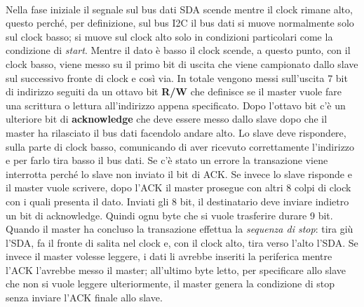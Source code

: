 \documentclass[12pt, a4paper]{report}
\begin{document}
\\Nella fase iniziale il segnale sul bus dati SDA scende mentre il clock rimane alto, questo perché, per definizione, sul bus I2C il bus dati si muove normalmente solo sul clock basso; si muove sul clock alto solo in condizioni particolari come la condizione di \textit{start}. Mentre il dato è basso il clock scende, a questo punto, con il clock basso, viene messo su il primo bit di uscita che viene campionato dallo slave sul successivo fronte di clock e così via. In totale vengono messi sull'uscita 7 bit di indirizzo seguiti da un ottavo bit \textbf{R/W} che definisce se il master vuole fare una scrittura o lettura all'indirizzo appena specificato. Dopo l'ottavo bit c'è un ulteriore bit di \textbf{acknowledge} che deve essere messo dallo slave dopo che il master ha rilasciato il bus dati facendolo andare alto. Lo slave deve rispondere, sulla parte di clock basso, comunicando di aver ricevuto correttamente l'indirizzo e per farlo tira basso il bus dati. Se c'è stato un errore la transazione viene interrotta perché lo slave non inviato il bit di ACK. Se invece lo slave risponde e il master vuole scrivere, dopo l'ACK il master prosegue con altri 8 colpi di clock con i quali presenta il dato. Inviati gli 8 bit, il destinatario deve inviare indietro un bit di acknowledge. Quindi ognu byte che si vuole trasferire durare 9 bit. Quando il master ha concluso la transazione effettua la \textit{sequenza di stop}: tira giù l'SDA, fa il fronte di salita nel clock e, con il clock alto, tira verso l'alto l'SDA. Se invece il master volesse leggere, i dati li avrebbe inseriti la periferica mentre l'ACK l'avrebbe messo il master; all'ultimo byte letto, per specificare allo slave che non si vuole leggere ulteriormente, il master genera la condizione di stop senza inviare l'ACK finale allo slave.
\end{document}
